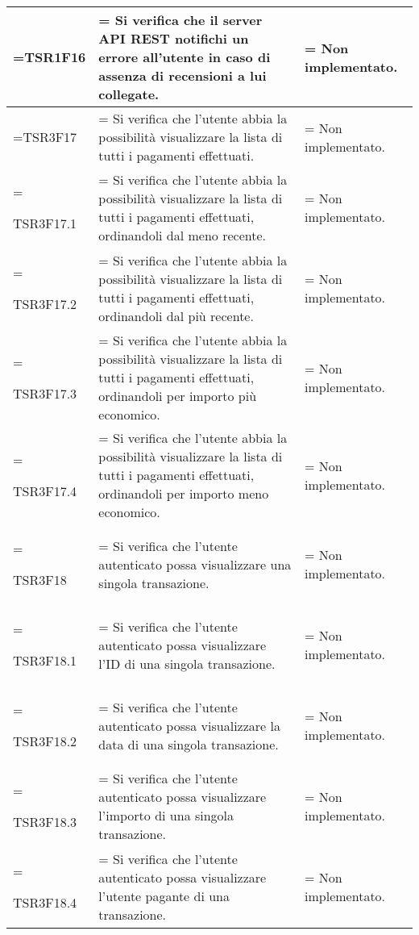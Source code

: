 \begin{xltabular}{\textwidth} {
        >{\hsize\linewidth=\hsize}X
        >{\hsize\linewidth=\hsize}X
        >{\hsize\linewidth=\hsize}X
    }
    TSR1F16 &
    Si verifica che il server API REST notifichi un errore all'utente in caso di assenza di recensioni a lui collegate. &
    Non implementato.
    \\ \hline


    TSR3F17 &
    Si verifica che l'utente abbia la possibilità visualizzare la lista di tutti i pagamenti
    effettuati. &
    Non implementato.
    \\ \hline

    TSR3F17.1 &
    Si verifica che l'utente abbia la possibilità visualizzare la lista di tutti i pagamenti
    effettuati, ordinandoli dal meno recente. &
    Non implementato.
    \\ \hline

    TSR3F17.2 &
    Si verifica che l'utente abbia la possibilità visualizzare la lista di tutti i pagamenti
    effettuati, ordinandoli dal più recente. &
    Non implementato.
    \\ \hline

    TSR3F17.3 &
    Si verifica che l'utente abbia la possibilità visualizzare la lista di tutti i pagamenti
    effettuati, ordinandoli per importo più economico. &
    Non implementato.
    \\ \hline
    
    TSR3F17.4 &
    Si verifica che l'utente abbia la possibilità visualizzare la lista di tutti i pagamenti
    effettuati, ordinandoli per importo meno economico. &
    Non implementato.
    \\ \hline

    TSR3F18 &
    Si verifica che l'utente autenticato possa visualizzare una singola transazione. &
    Non implementato.
    \\ \hline

    TSR3F18.1 &
    Si verifica che l'utente autenticato possa visualizzare l'ID di una singola transazione. &
    Non implementato.
    \\ \hline


    TSR3F18.2 &
    Si verifica che l'utente autenticato possa visualizzare la data di una singola transazione. &
    Non implementato.
    \\ \hline

    TSR3F18.3 &
    Si verifica che l'utente autenticato possa visualizzare l'importo di una singola transazione. &
    Non implementato.
    \\ \hline

    TSR3F18.4 &
    Si verifica che l'utente autenticato possa visualizzare l'utente pagante di una transazione. &
    Non implementato.
    \\ \hline


\end{xltabular}
